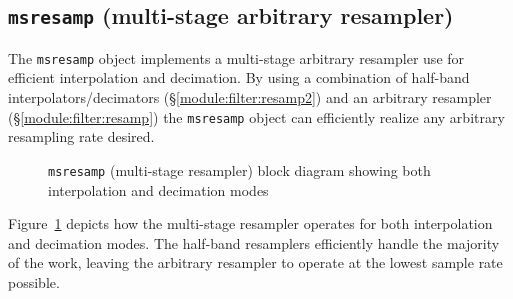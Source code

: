 % 
%
\subsection{{\tt msresamp} (multi-stage arbitrary resampler)}
\label{module:filter:msresamp}
The {\tt msresamp} object implements a multi-stage arbitrary resampler
use for efficient interpolation and decimation.
By using a combination of half-band interpolators/decimators
(\S\ref{module:filter:resamp2})
and an arbitrary resampler (\S\ref{module:filter:resamp})
the {\tt msresamp} object can
efficiently realize any arbitrary resampling rate desired.
%
%
\begin{figure}
\centering
{}
\caption{{\tt msresamp} (multi-stage resampler) block diagram showing
         both interpolation and decimation modes}
\label{fig:module:filter:msresamp_diagram}
\end{figure}
%
Figure~\ref{fig:module:filter:msresamp_diagram} depicts how the
multi-stage resampler operates for both interpolation and decimation
modes.
The half-band resamplers efficiently handle the majority of the work,
leaving the arbitrary resampler to operate at the lowest sample rate
possible.

